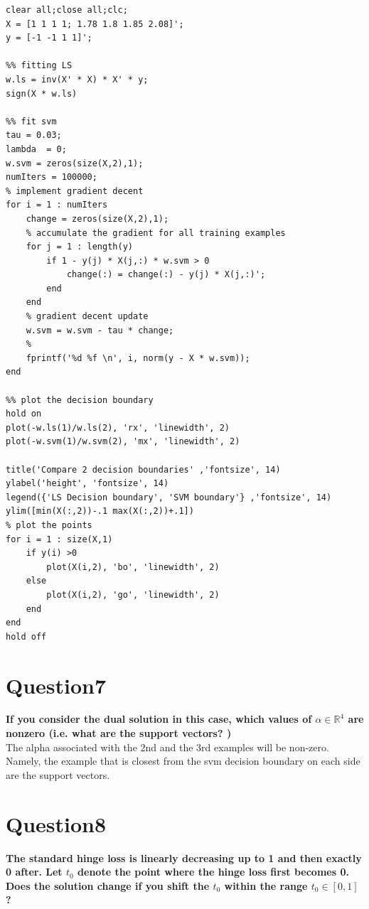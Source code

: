 \documentclass[paper=a4, fontsize=11pt]{scrartcl} %
\numberwithin{equation}{section} %
\numberwithin{figure}{section} %
\numberwithin{table}{section} %
\begin{document}
\begin{lstlisting}
clear all;close all;clc;
X = [1 1 1 1; 1.78 1.8 1.85 2.08]';
y = [-1 -1 1 1]';

%% fitting LS
w.ls = inv(X' * X) * X' * y;
sign(X * w.ls)

%% fit svm
tau = 0.03;
lambda  = 0;
w.svm = zeros(size(X,2),1);
numIters = 100000;
% implement gradient decent
for i = 1 : numIters
    change = zeros(size(X,2),1);
    % accumulate the gradient for all training examples
    for j = 1 : length(y)
        if 1 - y(j) * X(j,:) * w.svm > 0 
            change(:) = change(:) - y(j) * X(j,:)';
        end
    end
    % gradient decent update
    w.svm = w.svm - tau * change;
    % 
    fprintf('%d %f \n', i, norm(y - X * w.svm));    
end

%% plot the decision boundary 
hold on
plot(-w.ls(1)/w.ls(2), 'rx', 'linewidth', 2)
plot(-w.svm(1)/w.svm(2), 'mx', 'linewidth', 2)

title('Compare 2 decision boundaries' ,'fontsize', 14)
ylabel('height', 'fontsize', 14)
legend({'LS Decision boundary', 'SVM boundary'} ,'fontsize', 14)
ylim([min(X(:,2))-.1 max(X(:,2))+.1])
% plot the points 
for i = 1 : size(X,1)
    if y(i) >0
        plot(X(i,2), 'bo', 'linewidth', 2)
    else
        plot(X(i,2), 'go', 'linewidth', 2)
    end
end
hold off
\end{lstlisting}

\newpage
\section*{Question7}
\textbf{If you consider the dual solution in this case, which values of $\alpha \in \mathbb{R}^4$ are nonzero (i.e. what are the support vectors? )}\\

The alpha associated with the 2nd and the 3rd examples will be non-zero. Namely, the example that is closest from the svm decision boundary on each side are the support vectors. 




\newpage
\section*{Question8}
\textbf{ The standard hinge loss is linearly decreasing up to 1 and then exactly 0 after. Let $t_0$ denote the point where the hinge loss first becomes 0. Does the solution change if you shift the $t_0$ within the range $t_0 \in [0, 1]$?}\\
\end{document}
